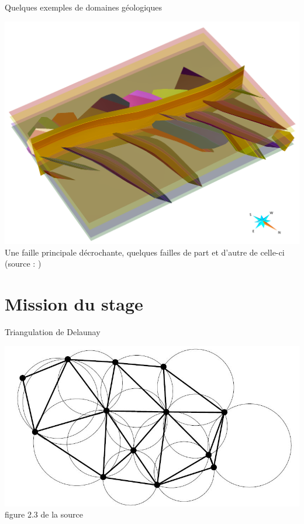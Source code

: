 \documentclass[aspectratio=169, 12pt, a4paper, hyperref={pdfauthor={Alexandre MARIN}, pdfkeywords={IFPEN, Delaunay, Voronoi, mesh generation}, colorlinks=true, linkcolor=purple, urlcolor=blue, citecolor=magenta}]{beamer}
\begin{document}
\begin{Energie}{\small Quelques exemples de domaines géologiques}
\begin{center}
\includegraphics[scale=0.25]{Clyde.png}
\\Une faille principale décrochante, quelques failles de part et d'autre de celle-ci (source : \cite{TERTOIS_RM2020})
\end{center}
\end{Energie}


\section{Mission du stage}
\begin{Energie}{}
\tableofcontents[currentsection]
\end{Energie}

\begin{Energie}{Triangulation de Delaunay}
\begin{center}
\includegraphics[scale=0.55]{../pictures/delTri.jpg}
\\figure 2.3 de la source \cite{delnotes}
\end{center}
\end{Energie}
\end{document}
